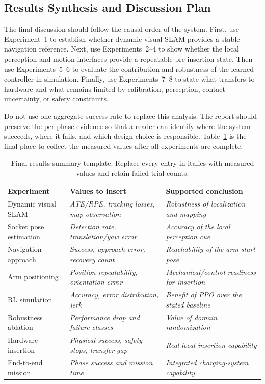 \subsection{Results Synthesis and Discussion Plan}\label{exp:sec:discussion}

The final discussion should follow the causal order of the system. First, use Experiment~1 to establish whether dynamic visual SLAM provides a stable navigation reference. Next, use Experiments~2--4 to show whether the local perception and motion interfaces provide a repeatable pre-insertion state. Then use Experiments~5--6 to evaluate the contribution and robustness of the learned controller in simulation. Finally, use Experiments~7--8 to state what transfers to hardware and what remains limited by calibration, perception, contact uncertainty, or safety constraints.

Do not use one aggregate success rate to replace this analysis. The report should preserve the per-phase evidence so that a reader can identify where the system succeeds, where it fails, and which design choice is responsible. Table~\ref{exp:tab:summary-results} is the final place to collect the measured values after all experiments are complete.

\begin{table}[!htbp]
\centering
\caption{Final results-summary template. Replace every entry in italics with measured values and retain failed-trial counts.}
\label{exp:tab:summary-results}
\small
\setlength{\tabcolsep}{4pt}
\begin{tabular}{@{}>{\raggedright\arraybackslash}p{}>{\raggedright\arraybackslash}p{}>{\raggedright\arraybackslash}p{}@{}}
\toprule
Experiment & Values to insert & Supported conclusion \\
\midrule
Dynamic visual SLAM & \textit{ATE/RPE, tracking losses, map observation} & \textit{Robustness of localization and mapping} \\
Socket pose estimation & \textit{Detection rate, translation/yaw error} & \textit{Accuracy of the local perception cue} \\
Navigation approach & \textit{Success, approach error, recovery count} & \textit{Reachability of the arm-start pose} \\
Arm positioning & \textit{Position repeatability, orientation error} & \textit{Mechanical/control readiness for insertion} \\
RL simulation & \textit{Accuracy, error distribution, jerk} & \textit{Benefit of PPO over the stated baseline} \\
Robustness ablation & \textit{Performance drop and failure classes} & \textit{Value of domain randomization} \\
Hardware insertion & \textit{Physical success, safety stops, transfer gap} & \textit{Real local-insertion capability} \\
End-to-end mission & \textit{Phase success and mission time} & \textit{Integrated charging-system capability} \\
\bottomrule
\end{tabular}
\end{table}

\endgroup
